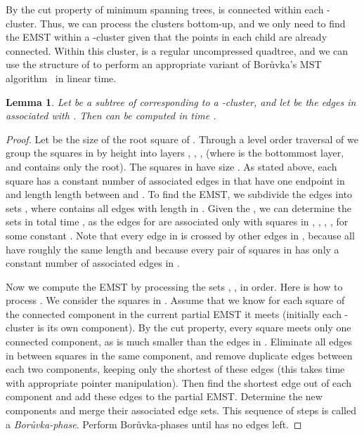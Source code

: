 \documentclass[11pt]{paper}
\newcommand {\boruvka}{Bor\r{u}vka}
\newtheorem {lem}[theorem] {Lemma}
\begin{document}
  By the cut property of minimum spanning trees,
   is connected within each -cluster. Thus, we can process
  the clusters bottom-up, and we
  only need to find the EMST within a -cluster given
  that the points in each child are already connected. 
  Within this cluster,  is a regular uncompressed quadtree,
  and we can use the structure of  to perform an appropriate
  variant of \boruvka's MST algorithm~\cite{Boruvka26,Tarjan83} in linear time.

  \begin{lem}\label{lem:extract-emst}
    Let  be a subtree of  corresponding to a -cluster, and
    let  be the edges in  associated with .
    Then  can be computed in time .
  \end{lem}

\begin{proof}
  Let  be the size of the root square of .
  Through a level order traversal of  we group the
  squares in  by height into layers , , , 
  (where  is the bottommost layer, and  contains
  only the root). The squares in  have size .
  As stated above, each square  has a constant number of
  associated edges in  that have one endpoint in  and length
  length  between  and .
  To find the EMST, we subdivide the edges into
  sets , where  contains all edges with length
  in . Given the
  , we can determine the sets  in total time
  , as the edges for  are
  associated only with squares in , ,
  , ,
  for some constant . 
  Note that every edge
  in  is crossed by  other edges in , because all
   have roughly the same length and because every pair of squares in
   has only a constant number of associated edges in .

  Now we compute the EMST by processing the sets ,
  ,  in order. Here is how to
  process . We consider the squares in .
  Assume that we know for each square of  the connected
  component in the current partial EMST it meets (initially
  each -cluster is its own component). By the cut property, every
  square  meets
  only one connected component, as  is much smaller than the
  edges in .
  Eliminate all edges in  between squares in the same component,
  and 
  remove duplicate edges between
  each two components, keeping only the shortest of these edges
  (this takes  time with appropriate pointer manipulation).
  Then find the shortest edge out of each component
  and add these edges to the partial EMST. Determine the new components
  and merge their associated edge sets.
  This sequence of steps is called
  a \emph{\boruvka-phase}.
  Perform \boruvka-phases until  has no edges left.


\end{proof}
\end{document}
